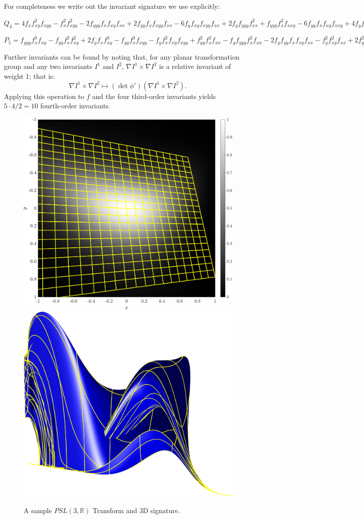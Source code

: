 \documentclass[review,onefignum,onetabnum]{siamonline190516}
\begin{document}
{
For completeness we write out the invariant signature we use explicitly:

$Q_4=4 f_x  f_{xy} ^2 f_{xyy}  - 
f_x ^2 f_{xyy} ^2 - 
 2 f_{yyy}  f_x  f_{xy}  f_{xx}  + 
 2 f_{yy}  f_x  f_{xyy}  f_{xx}  - 
 6 f_{y}  f_{xy}  f_{xyy}  f_{xx}  + 
 2 f_{y}  f_{yyy}  f_{xx} ^2 + 
 f_{yyy}  f_x ^2 f_{xxy}  - 
 6 f_{yy}  f_x  f_{xy}  f_{xxy}  + 
 4 f_{y}  f_{xy} ^2 f_{xxy}  + 
 f_{y}  f_x  f_{xyy}  f_{xxy}  + 
 2 f_{y}  f_{yy}  f_{xx}  f_{xxy}  - 
 f_{y} ^2 f_{xxy} ^2 + 
 2 f_{yy} ^2 f_x  f_{xxx}  - 
 f_{y}  f_{yyy}  f_x  f_{xxx}  - 
 2 f_{y}  f_{yy}  f_{xy}  f_{xxx}  + f_{y} ^2 f_{xyy}  f_{xxx}, $
 
$P_5=f_{yyy}  f_{x} ^3 f_{xy}  - 
f_{yy}  f_{x} ^2 f_{xy} ^2 + 
 2 f_{y}  f_{x}  f_{xy} ^3 - 
 f_{yy}  f_{x} ^3 f_{xyy}  - 
 f_{y}  f_{x} ^2 f_{xy}  f_{xyy}  + 
 f_{yy} ^2 f_{x} ^2 f_{xx}  - 
 f_{y}  f_{yyy}  f_{x} ^2 f_{xx}  - 
 2 f_{y}  f_{yy}  f_{x}  f_{xy}  f_{xx}  - 
 f_{y} ^2 f_{xy} ^2 f_{xx}  + 
 2 f_{y} ^2 f_{x}  f_{xyy}  f_{xx}  + 
 f_{y} ^2 f_{yy}  f_{xx} ^2 + 
 2 f_{y}  f_{yy}  f_{x} ^2 f_{xxy}  - 
 f_{y} ^2 f_{x}  f_{xy}  f_{xxy}  - 
 f_{y} ^3 f_{xx}  f_{xxy}  - 
 f_{y} ^2 f_{yy}  f_{x}  f_{xxx}  + 
 f_{y} ^3 f_{xy}  f_{xxx}. $
 
Further invariants can be found by noting that, for any planar transformation group and any two invariants
$I^1$ and $I^2$, $\nabla I^1 \times \nabla I^2$ is a relative invariant of weight 1; that is:
$$\nabla I^1 \times \nabla I^2\mapsto (\det \phi')(\nabla I^1 \times \nabla I^2).$$
Applying this operation to $f$ and the four third-order invariants yields $5\cdot4/2=10$ fourth-order invariants.

\begin{figure}
\centering
\includegraphics[width=.45\textwidth]{Figs/f_transformed_PSL3R.png}
\includegraphics[width=.45\textwidth]{Figs/PSL3R_signature.png}
\caption{A sample $PSL(3,\mathbb{R})$ Transform and 3D signature.}
\label{fig:PSL3R}
\end{figure}

}
\end{document}
